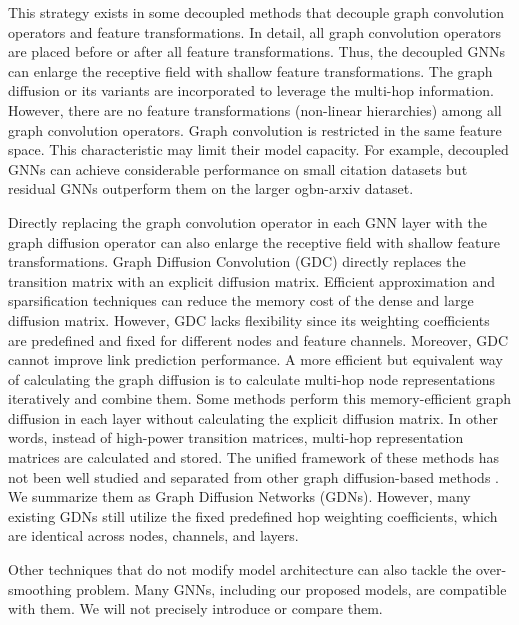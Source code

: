 \documentclass{article}
\begin{document}
This strategy exists in some decoupled methods \cite{liu2020towards, klicpera2018predict, rossi2020sign} that decouple graph convolution operators and feature transformations. In detail, all graph convolution operators are placed before or after all feature transformations. Thus, the decoupled GNNs can enlarge the receptive field with shallow feature transformations. The graph diffusion or its variants are incorporated to leverage the multi-hop information. However, there are no feature transformations (non-linear hierarchies) among all graph convolution operators. Graph convolution is restricted in the same feature space. This characteristic may limit their model capacity. For example, decoupled GNNs can achieve considerable performance on small citation datasets but residual GNNs outperform them on the larger ogbn-arxiv dataset. 

Directly replacing the graph convolution operator in each GNN layer with the graph diffusion operator can also enlarge the receptive field with shallow feature transformations. Graph Diffusion Convolution (GDC) directly replaces the transition matrix with an explicit diffusion matrix. Efficient approximation and sparsification techniques can reduce the memory cost of the dense and large diffusion matrix. However, GDC lacks flexibility since its weighting coefficients are predefined and fixed for different nodes and feature channels. Moreover, GDC cannot improve link prediction performance. A more efficient but equivalent way of calculating the graph diffusion is to calculate multi-hop node representations iteratively and combine them. Some methods perform this memory-efficient graph diffusion in each layer without calculating the explicit diffusion matrix. In other words, instead of high-power transition matrices, multi-hop representation matrices are calculated and stored. The unified framework of these methods has not been well studied and separated from other graph diffusion-based methods \cite{klicpera2018predict, liu2020towards, klicpera2019diffusion}. We summarize them as Graph Diffusion Networks (GDNs). However, many existing GDNs still utilize the fixed predefined hop weighting coefficients, which are identical across nodes, channels, and layers.


Other techniques \cite{zhao2019pairnorm, rong2019dropedge, feng2020graph} that do not modify model architecture can also tackle the over-smoothing problem. Many GNNs, including our proposed models, are compatible with them. We will not precisely introduce or compare them.
\end{document}
